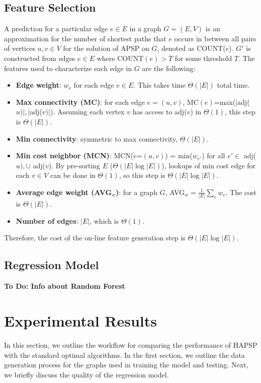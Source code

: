 \documentclass[journal]{IEEEtran}
\begin{document}
\subsection{Feature Selection}
	A prediction for a particular edge $e\in E$ in a graph $G=(E,V)$ 
	is an approximation for the number of shortest paths 
	that $e$ occurs in between all pairs of vertices $u,v\in V$ for the solution of APSP on $G$, denoted as 
	COUNT($e$). $G'$ is constructed from edges $e\in E$ where COUNT$(e)>T$ for some threshold $T$. 
	The features used to characterize each edge in $G$ are the following:
	\begin{itemize}
		\item {\bf{Edge weight}}: $w_e$ for each edge $e\in E$. This takes time $\Theta(|E|)$ total time.
		\item{\bf{Max connectivity (MC)}}: for each edge $e=(u,v)$, MC$(e)$=max($|$adj($u)|,|$adj($v)|$).
			Assuming each vertex $v$ has access to adj($v$) in $\Theta(1)$, this step is $\Theta(|E|)$.
		\item{\bf{Min connectivity}}: symmetric to max connectivity, $\Theta(|E|)$. 
		\item{\bf{Min cost neighbor (MCN)}}: MCN($e$=$(u,v)$) = min($w_{e'}$) for all $e'\in$ adj($u),\cup$
			adj($v$). By pre-sorting $E$ ($\Theta(|E|\log|E|)$), lookups of min cost edge for each $v\in V$
			can be done in $\Theta(1)$, so this step is $\Theta(|E|\log|E|)$.
		\item{\bf{Average edge weight (AVG$_w$)}}: for a graph $G$, AVG$_w = \frac{1}{|E|}\sum_{e}w_e$.
			The cost is $\Theta(|E|)$.
		\item{\bf{Number of edges}}: $|E|$, which is $\Theta(1)$.
	\end{itemize}
	Therefore, the cost of the on-line feature generation step is $\Theta(|E|\log|E|)$.
	
\subsection{Regression Model}
	{\bf{To Do: Info about Random Forest}}
	
\section{Experimental Results}
	In this section, we outline the workflow for comparing the performance of HAPSP with the
	standard optimal algorithms. In the first section, we outline the data generation process
	for the graphs used in training the model and testing. Next, we briefly discuss the quality
	of the regression model.
	
\end{document}
